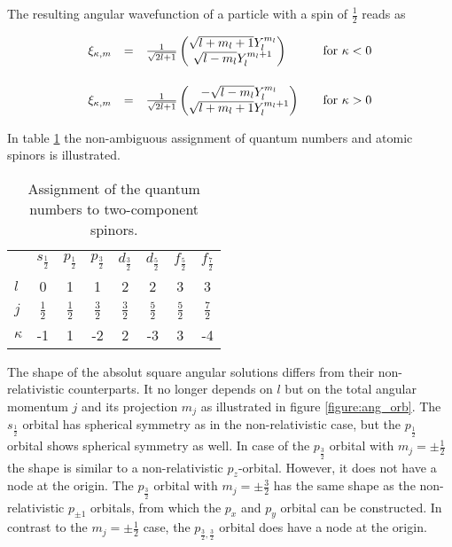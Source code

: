 The resulting angular wavefunction of a particle with a spin of $\frac12$ reads as

\begin{equation}\begin{array}{rcll}
\xi_{\kappa,m} &=& \frac1{\sqrt{2l+1}}\begin{pmatrix}\sqrt{l+m_l+1}Y_l^{m_l}\\\sqrt{l-m_l}Y_l^{m_l+1}\end{pmatrix} &\quad\text{for }\kappa<0\\\vphantom{\rule{0pt}{30pt}}
\xi_{\kappa,m} &=& \frac1{\sqrt{2l+1}}\begin{pmatrix}-\sqrt{l-m_l}Y_l^{m_l}\\\sqrt{l+m_l+1}Y_l^{m_l+1}\end{pmatrix} &\quad\text{for }\kappa>0\\
\end{array}\end{equation}

In table \ref{qzspinor} the non-ambiguous assignment of quantum numbers and atomic
spinors is illustrated.

\begin{table}[h]
\centering
\begin{tabular}{lccccccc}
\toprule
        & $s_{\frac12}$ & $p_{\frac12}$ & $p_{\frac32}$ & $d_{\frac32}$ & $d_{\frac52}$ & $f_{\frac52}$ & $f_{\frac72}$\\\vphantom{\rule{0pt}{20pt}}
$l$     & 0            & 1           & 1            & 2            & 2            & 3            & 3\\\vphantom{\rule{0pt}{20pt}}
$j$     & $\frac12$    & $\frac12$   & $\frac32$    & $\frac32$    & $\frac52$    & $\frac52$    & $\frac72$\\\vphantom{\rule{0pt}{20pt}}
$\kappa$& -1           & 1           & -2           & 2            & -3           & 3            & -4\\
\bottomrule
\end{tabular}
\caption{Assignment of the quantum numbers to two-component spinors.\cite{dyallfaegri}}
\label{qzspinor}
\end{table}

The shape of the absolut square angular solutions differs from their
non-relativistic counterparts. It no longer depends on $l$ but on the total
angular momentum $j$ and its projection $m_j$ as illustrated in figure
\ref{figure:ang_orb}. The $s_{\frac12}$ orbital has spherical symmetry as
in the non-relativistic case, but the $p_{\frac12}$ orbital shows spherical
symmetry as well. In case of the $p_{\frac32}$ orbital with $m_j=\pm \frac12$
the shape is similar to a non-relativistic $p_z$-orbital. However, it does not
have a node at the origin. The $p_{\frac32}$ orbital with $m_j=\pm \frac32$
has the same shape as the non-relativistic $p_{\pm 1}$ orbitals, from which
the $p_x$ and $p_y$ orbital can be constructed. In contrast to the
$m_j=\pm \frac12$ case, the $p_{\frac32,\frac32}$ orbital does have a node at
the origin.


